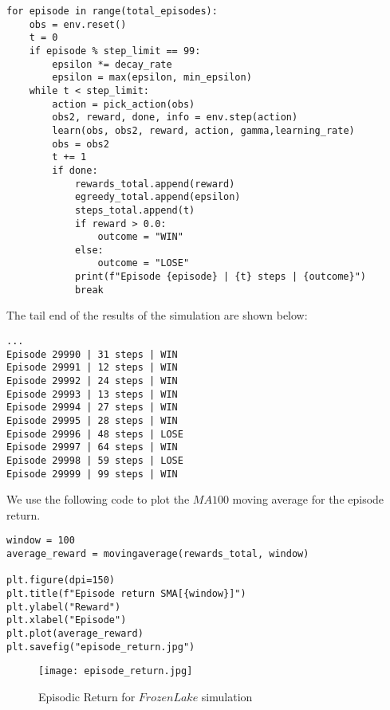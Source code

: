 \documentclass[12pt, letterpaper]{article}
\begin{document}
\begin{mdframed}[backgroundcolor=shadecolor]
\begin{verbatim}
for episode in range(total_episodes):
    obs = env.reset()
    t = 0
    if episode % step_limit == 99:
        epsilon *= decay_rate
        epsilon = max(epsilon, min_epsilon)
    while t < step_limit:
        action = pick_action(obs)
        obs2, reward, done, info = env.step(action)
        learn(obs, obs2, reward, action, gamma,learning_rate)
        obs = obs2
        t += 1
        if done:            
            rewards_total.append(reward)
            egreedy_total.append(epsilon)
            steps_total.append(t)
            if reward > 0.0:
                outcome = "WIN"                
            else:
                outcome = "LOSE"
            print(f"Episode {episode} | {t} steps | {outcome}")
            break
\end{verbatim}
\end{mdframed}

The tail end of the results of the simulation are shown below:

\begin{lstlisting}
...
Episode 29990 | 31 steps | WIN
Episode 29991 | 12 steps | WIN
Episode 29992 | 24 steps | WIN
Episode 29993 | 13 steps | WIN
Episode 29994 | 27 steps | WIN
Episode 29995 | 28 steps | WIN
Episode 29996 | 48 steps | LOSE
Episode 29997 | 64 steps | WIN
Episode 29998 | 59 steps | LOSE
Episode 29999 | 99 steps | WIN
\end{lstlisting}

We use the following code to plot the $MA100$ moving average for the episode return.

\begin{mdframed}[backgroundcolor=shadecolor]
\begin{verbatim}
window = 100
average_reward = movingaverage(rewards_total, window)

plt.figure(dpi=150)
plt.title(f"Episode return SMA[{window}]")
plt.ylabel("Reward")
plt.xlabel("Episode")
plt.plot(average_reward)
plt.savefig("episode_return.jpg")
\end{verbatim}
\end{mdframed}

\begin{figure}[hbt!]
    \caption{Episodic Return for $FrozenLake$ simulation}
    \centering
    \texttt{[image: episode\_return.jpg]}
\end{figure}
\end{document}
